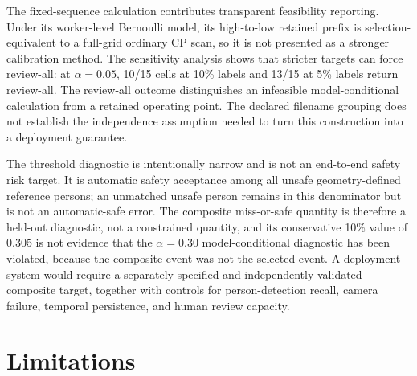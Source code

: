 \documentclass[iicol,pdflatex,sn-mathphys-num]{sn-jnl}
\begin{document}
The fixed-sequence calculation contributes transparent feasibility reporting. Under its worker-level Bernoulli model, its high-to-low retained prefix is selection-equivalent to a full-grid ordinary CP scan, so it is not presented as a stronger calibration method. The sensitivity analysis shows that stricter targets can force review-all: at $\alpha=0.05$, 10/15 cells at 10\% labels and 13/15 at 5\% labels return review-all. The review-all outcome distinguishes an infeasible model-conditional calculation from a retained operating point. The declared filename grouping does not establish the independence assumption needed to turn this construction into a deployment guarantee.

The threshold diagnostic is intentionally narrow and is not an end-to-end safety risk target. It is automatic safety acceptance among all unsafe geometry-defined reference persons; an unmatched unsafe person remains in this denominator but is not an automatic-safe error. The composite miss-or-safe quantity is therefore a held-out diagnostic, not a constrained quantity, and its conservative 10\% value of $0.305$ is not evidence that the $\alpha=0.30$ model-conditional diagnostic has been violated, because the composite event was not the selected event. A deployment system would require a separately specified and independently validated composite target, together with controls for person-detection recall, camera failure, temporal persistence, and human review capacity.

\section{Limitations}\label{sec:limitations}
\end{document}
